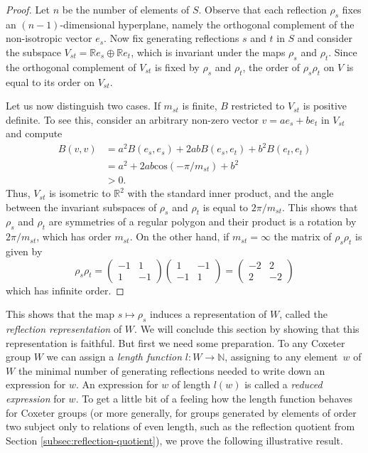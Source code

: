 \documentclass[main.tex]{subfiles}
\begin{document}
\begin{proof}
Let $n$ be the number of elements of $S$. Observe that each
reflection $\rho_s$ fixes an $(n-1)$-dimensional hyperplane,
namely the orthogonal complement of the non-isotropic vector
$e_s$. Now fix generating reflections $s$ and $t$ in $S$ and 
consider the subspace 
$V_{st} = \mathbb{R}e_s \oplus \mathbb{R}e_t$,
which is invariant under the maps $\rho_s$ and $\rho_t$. 
Since the orthogonal complement of $V_{st}$ is fixed by $\rho_s$ 
and $\rho_t$, the order of $\rho_s\rho_t$ on $V$ is equal to its 
order on $V_{st}$.

Let us now distinguish two cases. If $m_{st}$ is finite, $B$ 
restricted to $V_{st}$ is positive definite. To see this, 
consider an arbitrary non-zero vector $v = ae_s + b e_t$ in 
$V_{st}$ and compute
\begin{align*}
B(v, v) & = a^2B(e_s, e_s) + 2abB(e_s, e_t) + b^2B(e_t, e_t) \\
		& = a^2 + 2ab\text{cos}( -\pi / m_{st} ) + b^2 \\
		& > 0.
\end{align*}
Thus, $V_{st}$ is isometric to $\mathbb{R}^2$ with the standard 
inner product, and the angle between the invariant subspaces of 
$\rho_s$ and $\rho_t$ is equal to $2 \pi / m_{st}$. This shows 
that $\rho_s$ and $\rho_t$ are symmetries of a regular polygon 
and their product is a rotation by $2\pi/m_{st}$, which has 
order $m_{st}$.
On the other hand, if $m_{st} = \infty$ the matrix of 
$\rho_s\rho_t$ is given by
$$
\rho_s \rho_t = 
\left( \begin{matrix}
	-1 & 1 \\ 1 & -1
\end{matrix} \right)
\left( \begin{matrix}
	1 & -1 \\ -1 & 1
\end{matrix} \right)
= 
\left( \begin{matrix}
	-2 & 2 \\ 2 & -2
\end{matrix} \right)
$$
which has infinite order.
\end{proof}

This shows that the map $s \mapsto \rho_s$ induces a 
representation of $W$, called the 
\textit{reflection representation} 
of $W$. We will conclude this section by showing that this 
representation is faithful. But first we need some preparation.
To any Coxeter group $W$ we can assign a 
\textit{length function} 
$l: W \rightarrow \mathbb{N}$, 
assigning to any element~$w$ of $W$ the minimal number of 
generating reflections needed to write down an expression 
for $w$. An expression for $w$ of length $l(w)$ is called a 
\textit{reduced expression} for $w$.
To get a little bit of a feeling how the length function behaves 
for Coxeter groups (or more generally, for groups generated by 
elements of order two subject only to relations of even length, 
such as the reflection quotient from Section 
\ref{subsec:reflection-quotient}), we prove the following 
illustrative result.
\end{document}
